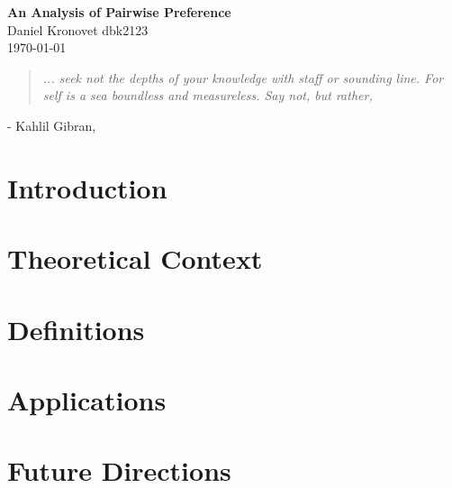 \documentclass[12pt]{book}
\begin{document}
\begin{center}
  \Large \textbf{An Analysis of Pairwise Preference} \\
  \vspace{0.1in}
  \normalsize Daniel Kronovet dbk2123\\
  \today
\end{center}
  
\begin{center}  
\begin{quotation}
\textit{
	... seek not the depths of your knowledge with staff or sounding line.
	For self is a sea boundless and measureless.
	Say not,  but rather, 
	}
\end{quotation}
- Kahlil Gibran, \textit{} 
\end{center}

\section{Introduction}


\section{Theoretical Context}


\section{Definitions}


\section{Applications}


\section{Future Directions}


\printbibliography
\end{document}
